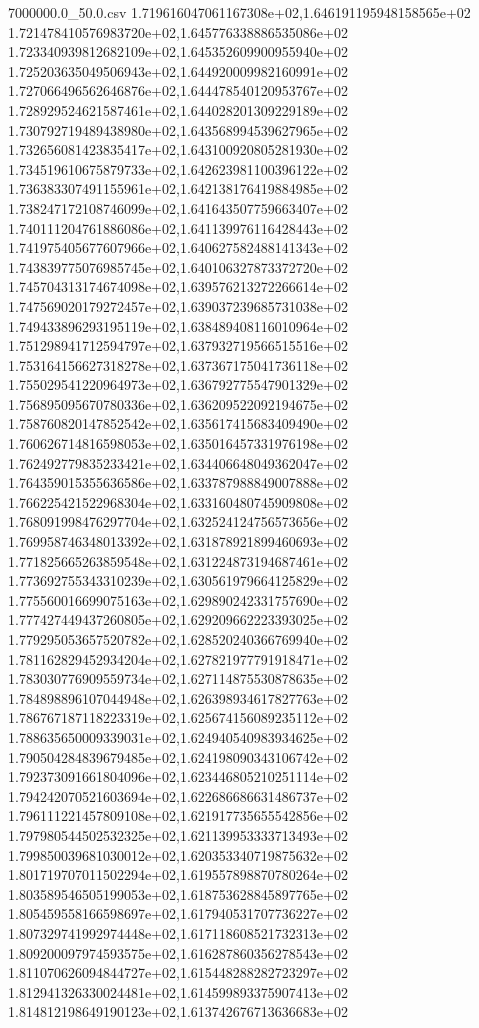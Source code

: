 \begin{filecontents*}{7000000.0_50.0.csv}
1.719616047061167308e+02,1.646191195948158565e+02
1.721478410576983720e+02,1.645776338886535086e+02
1.723340939812682109e+02,1.645352609900955940e+02
1.725203635049506943e+02,1.644920009982160991e+02
1.727066496562646876e+02,1.644478540120953767e+02
1.728929524621587461e+02,1.644028201309229189e+02
1.730792719489438980e+02,1.643568994539627965e+02
1.732656081423835417e+02,1.643100920805281930e+02
1.734519610675879733e+02,1.642623981100396122e+02
1.736383307491155961e+02,1.642138176419884985e+02
1.738247172108746099e+02,1.641643507759663407e+02
1.740111204761886086e+02,1.641139976116428443e+02
1.741975405677607966e+02,1.640627582488141343e+02
1.743839775076985745e+02,1.640106327873372720e+02
1.745704313174674098e+02,1.639576213272266614e+02
1.747569020179272457e+02,1.639037239685731038e+02
1.749433896293195119e+02,1.638489408116010964e+02
1.751298941712594797e+02,1.637932719566515516e+02
1.753164156627318278e+02,1.637367175041736118e+02
1.755029541220964973e+02,1.636792775547901329e+02
1.756895095670780336e+02,1.636209522092194675e+02
1.758760820147852542e+02,1.635617415683409490e+02
1.760626714816598053e+02,1.635016457331976198e+02
1.762492779835233421e+02,1.634406648049362047e+02
1.764359015355636586e+02,1.633787988849007888e+02
1.766225421522968304e+02,1.633160480745909808e+02
1.768091998476297704e+02,1.632524124756573656e+02
1.769958746348013392e+02,1.631878921899460693e+02
1.771825665263859548e+02,1.631224873194687461e+02
1.773692755343310239e+02,1.630561979664125829e+02
1.775560016699075163e+02,1.629890242331757690e+02
1.777427449437260805e+02,1.629209662223393025e+02
1.779295053657520782e+02,1.628520240366769940e+02
1.781162829452934204e+02,1.627821977791918471e+02
1.783030776909559734e+02,1.627114875530878635e+02
1.784898896107044948e+02,1.626398934617827763e+02
1.786767187118223319e+02,1.625674156089235112e+02
1.788635650009339031e+02,1.624940540983934625e+02
1.790504284839679485e+02,1.624198090343106742e+02
1.792373091661804096e+02,1.623446805210251114e+02
1.794242070521603694e+02,1.622686686631486737e+02
1.796111221457809108e+02,1.621917735655542856e+02
1.797980544502532325e+02,1.621139953333713493e+02
1.799850039681030012e+02,1.620353340719875632e+02
1.801719707011502294e+02,1.619557898870780264e+02
1.803589546505199053e+02,1.618753628845897765e+02
1.805459558166598697e+02,1.617940531707736227e+02
1.807329741992974448e+02,1.617118608521732313e+02
1.809200097974593575e+02,1.616287860356278543e+02
1.811070626094844727e+02,1.615448288282723297e+02
1.812941326330024481e+02,1.614599893375907413e+02
1.814812198649190123e+02,1.613742676713636683e+02

\end{filecontents*}
